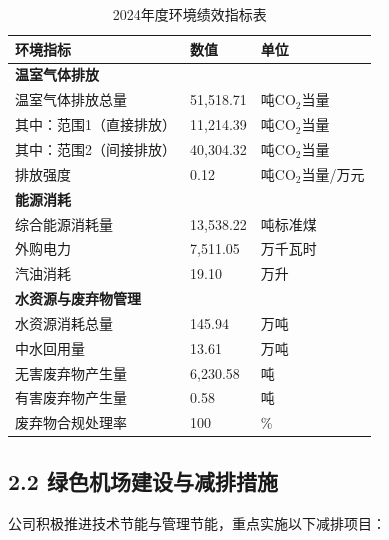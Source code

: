 \documentclass[a4paper,12pt]{article}
\begin{document}
\begin{table}[H]
    \centering
    \caption{2024年度环境绩效指标表}
    \label{tab:env_kpi}
    \renewcommand{\arraystretch}{1.2}
    \begin{tabular}{p{8cm} p{3cm} p{3.5cm}}
        \toprule
        \textbf{环境指标} & \textbf{数值} & \textbf{单位} \\
        \midrule
        \multicolumn{3}{l}{\textbf{温室气体排放}} \\
        温室气体排放总量 & 51,518.71 & 吨CO$_2$当量 \\
        \quad 其中：范围1（直接排放） & 11,214.39 & 吨CO$_2$当量 \\
        \quad 其中：范围2（间接排放） & 40,304.32 & 吨CO$_2$当量 \\
        排放强度 & 0.12 & 吨CO$_2$当量/万元 \\
        \midrule
        \multicolumn{3}{l}{\textbf{能源消耗}} \\
        综合能源消耗量 & 13,538.22 & 吨标准煤 \\
        外购电力 & 7,511.05 & 万千瓦时 \\
        汽油消耗 & 19.10 & 万升 \\
        \midrule
        \multicolumn{3}{l}{\textbf{水资源与废弃物管理}} \\
        水资源消耗总量 & 145.94 & 万吨 \\
        中水回用量 & 13.61 & 万吨 \\
        无害废弃物产生量 & 6,230.58 & 吨 \\
        有害废弃物产生量 & 0.58 & 吨 \\
        废弃物合规处理率 & 100 & \% \\
        \bottomrule
    \end{tabular}
\end{table}

\subsection{2.2 绿色机场建设与减排措施}

公司积极推进技术节能与管理节能，重点实施以下减排项目：
\end{document}

